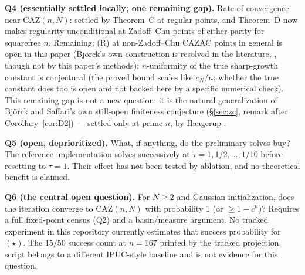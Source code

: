 \documentclass[11pt]{article}
\theoremstyle{plain}
\theoremstyle{definition}
\theoremstyle{remark}
\newcommand{\CAZ}{\mathrm{CAZ}}
\begin{document}
\noindent\textbf{Q4 (essentially settled locally; one remaining gap).} Rate of
convergence near $\CAZ(n,N)$: settled by Theorem~C at regular points, and
Theorem~D now makes regularity unconditional at Zadoff--Chu points of
either parity for squarefree $n$. Remaining: (R) at non-Zadoff--Chu CAZAC
points in general is open in this paper (Bj\"orck's own construction is
resolved in the literature, \cite{Benoist24}, though not by this paper's
methods); $n$-uniformity of
the true sharp-growth constant is conjectural (the proved bound scales
like $c_N/n$; whether the true constant does too is open and not backed
here by a specific numerical check). This remaining gap is not a new
question: it is the natural generalization of Bj\"orck and Saffari's own
still-open finiteness conjecture (\S\ref{sec:zc}, remark after
Corollary~\ref{cor:D2}) --- settled only at prime $n$, by Haagerup \cite{Haagerup08}.

\noindent\textbf{Q5 (open, deprioritized).} What, if anything, do the
preliminary solves buy? The reference implementation solves successively at
$\tau=1,1/2,\ldots,1/10$ before resetting to $\tau=1$. Their effect has not
been tested by ablation, and no theoretical benefit is claimed.

\noindent\textbf{Q6 (the central open question).} For $N\ge2$ and Gaussian
initialization, does the iteration converge to $\CAZ(n,N)$ with
probability $1$ (or $\ge1-c^n$)? Requires a full fixed-point census (Q2)
and a basin/measure argument. No tracked experiment in this repository
currently estimates that success probability for $(\star)$. The
$15/50$ success count at $n=167$ printed by the tracked projection script
belongs to a different IPUC-style baseline and is not evidence for this
question.
\end{document}
